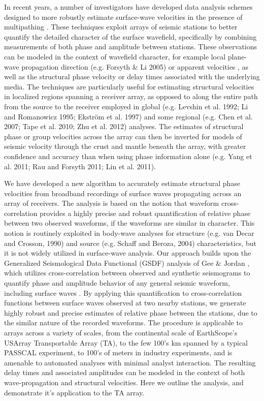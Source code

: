 \documentclass{gji}
\begin{document}
In recent years, a number of investigators have developed data analysis schemes designed to more robustly estimate surface-wave velocities in the presence of multipathing \cite{Friederich:1995ce,Forsyth:2005aa,Yang:2006fc,Lin:2009fx,Lin:2011fw,Yang:2011sw}.  These techniques exploit arrays of seismic stations to better quantify the detailed character of the surface wavefield, specifically by combining measurements of both phase and amplitude between stations.  These observations can be modeled in the context of wavefield character, for example local plane-wave propagation direction (e.g. Forsyth \& Li 2005) or apparent velocities \cite{Lin:2009fx}, as well as the structural phase velocity or delay times associated with the underlying media. The techniques are particularly useful for estimating structural velocities in localized regions spanning a receiver array, as opposed to along the entire path from the source to the receiver employed in global (e.g. Levshin et al. 1992; Li and Romanowicz 1995; Ekstr\"{o}m et al. 1997) and some regional (e.g. Chen et al. 2007; Tape et al. 2010; Zhu et al. 2012) analyses.  The estimates of structural phase or group velocities across the array can then be inverted for models of seismic velocity through the crust and mantle beneath the array, with greater confidence and accuracy than when using phase information alone (e.g. Yang et al. 2011; Rau and Forsyth 2011; Lin et al. 2011).

We have developed a new algorithm to accurately estimate structural phase velocities from broadband recordings of surface waves propagating across an array of receivers.  The analysis is based on the notion that waveform cross-correlation provides a highly precise and robust quantification of relative phase between two observed waveforms, if the waveforms are similar in character.  This notion is routinely exploited in body-wave analyses for structure (e.g. van Decar and Crosson, 1990) and source (e.g. Schaff and Beroza, 2004) characteristics, but it is not widely utilized in surface-wave analysis.  Our approach builds upon the Generalized Seismological Data Functional (GSDF) analysis of Gee \& Jordan , which utilizes cross-correlation between observed and synthetic seismograms to quantify phase and amplitude behavior of any general seismic waveform, including surface waves \cite{Gaherty:1995ld,Gaherty:1996ss,Gaherty:2004sw,Chen:2007ft,Chen:2007f3}.  By applying this quantification to cross-correlation functions between surface waves observed at two nearby stations, we generate highly robust and precise estimates of relative phase between the stations, due to the similar nature of the recorded waveforms.  The procedure is applicable to arrays across a variety of scales, from the continental scale of EarthScope's USArray Transportable Array (TA), to the few 100's km spanned by a typical PASSCAL experiment, to 100's of meters in industry experiments, and is amenable to automated analyses with minimal analyst interaction.  The resulting delay times and associated amplitudes can be modeled in the context of both wave-propagation and structural velocities.  Here we outline the analysis, and demonstrate it's application to the TA array.   
\end{document}
